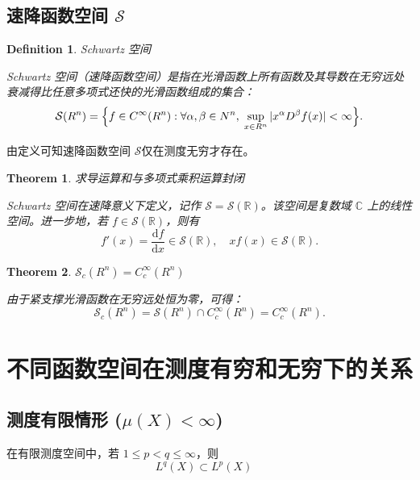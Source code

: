 \documentclass[linespread=1.5,openany]{book}%
\def\R{R}%
\def\N{N}%
\theoremstyle{plain}
\newtheorem{theorem}{Theorem}
\newtheorem{definition}{Definition}
\newcommand{\R}{\mathbb{R}}                %
\newcommand{\N}{\mathbb{N}}                %
\begin{document}
{{{{{{{{										\subsection{速降函数空间 $\mathcal S$}
										
										\begin{definition}Schwartz 空间
											
											Schwartz 空间（速降函数空间）是指在光滑函数上所有函数及其导数在无穷远处衰减得比任意多项式还快的光滑函数组成的集合：
											\[
											\mathcal S(\R^n)
											=\Bigl\{f\in C^\infty(\R^n):
											\forall\alpha,\beta\in\N^n,\;\sup_{x\in\R^n}|x^\alpha D^\beta f(x)|<\infty\Bigr\}.
											\]
										\end{definition}
										
										由定义可知速降函数空间 $\mathcal S$仅在测度无穷才存在。
										
										\begin{theorem}求导运算和与多项式乘积运算封闭
											
											Schwartz 空间在速降意义下定义，记作 \( \mathcal{S} = \mathcal{S}(\mathbb{R}) \)。该空间是复数域 \( \mathbb{C} \) 上的线性空间。进一步地，若 \( f \in \mathcal{S}(\mathbb{R}) \)，则有
											\[
											f'(x) = \frac{\mathrm{d}f}{\mathrm{d}x} \in \mathcal{S}(\mathbb{R}), \quad xf(x) \in \mathcal{S}(\mathbb{R}).
											\]
										\end{theorem}
										
										\begin{theorem}$\mathcal S_c(\R^n)=C_c^\infty(\R^n)$
											
											
											由于紧支撑光滑函数在无穷远处恒为零，可得：
											\[
											\mathcal S_c(\R^n)
											=\mathcal S(\R^n)\cap C_c^\infty(\R^n)
											=C_c^\infty(\R^n).
											\]
										\end{theorem}
										
										\section{不同函数空间在测度有穷和无穷下的关系}
										
										\subsection{测度有限情形 ($\mu(X)<\infty$)}
										
										在有限测度空间中，若 $1\leq p<q\le\infty$，则
										\[
										L^q(X)\subset L^p(X)\quad
										\]
										
}}}}}}}}
\end{document}
